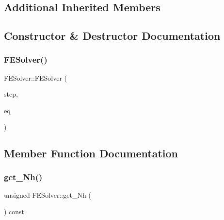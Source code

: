 \subsection*{Additional Inherited Members}


\subsection{Constructor \& Destructor Documentation}
\mbox{\label{classFESolver_adbd4e19eb5c39bdbced70671961bbc4d}} 
\subsubsection{\texorpdfstring{F\+E\+Solver()}{FESolver()}}
{\footnotesize\ttfamily F\+E\+Solver\+::\+F\+E\+Solver (\begin{DoxyParamCaption}\item[{double}]{step,  }\item[{const \hyperlink{classBaseEquation}{Base\+Equation} \&}]{eq }\end{DoxyParamCaption})}



\subsection{Member Function Documentation}
\mbox{\label{classFESolver_a1b7bde8ef3e3e4650096e1d56ad3add1}} 
\subsubsection{\texorpdfstring{get\+\_\+\+Nh()}{get\_Nh()}}
{\footnotesize\ttfamily unsigned F\+E\+Solver\+::get\+\_\+\+Nh (\begin{DoxyParamCaption}{ }\end{DoxyParamCaption}) const\hspace{0.3cm}{\ttfamily [inline]}}

\mbox{\label{classFESolver_a46f8b70e97141583f68c5dfeb79e80c8}} 
